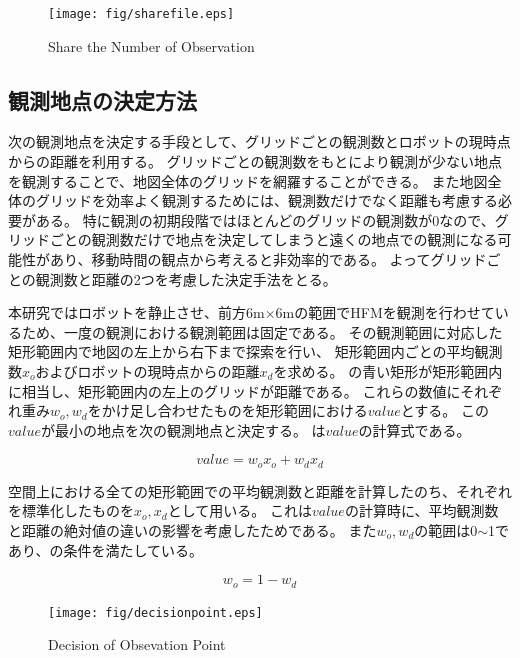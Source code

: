 \documentclass{jsarticle}
\begin{document}
\begin{figure}[tbh]
 \centering
  \texttt{[image: fig/sharefile.eps]}
  \vspace*{-4mm}
  \caption{Share the Number of Observation}
  \label{fig: sharefile}
\end{figure}


\subsection{観測地点の決定方法}
\label{decide}
次の観測地点を決定する手段として、グリッドごとの観測数とロボットの現時点からの距離を利用する。
グリッドごとの観測数をもとにより観測が少ない地点を観測することで、地図全体のグリッドを網羅することができる。
また地図全体のグリッドを効率よく観測するためには、観測数だけでなく距離も考慮する必要がある。
特に観測の初期段階ではほとんどのグリッドの観測数が0なので、グリッドごとの観測数だけで地点を決定してしまうと遠くの地点での観測になる可能性があり、移動時間の観点から考えると非効率的である。
よってグリッドごとの観測数と距離の2つを考慮した決定手法をとる。

本研究ではロボットを静止させ、前方6m$\times$6mの範囲でHFMを観測を行わせているため、一度の観測における観測範囲は固定である。
その観測範囲に対応した矩形範囲内で地図の左上から右下まで探索を行い、
矩形範囲内ごとの平均観測数$x_{o}$およびロボットの現時点からの距離$x_{d}$を求める。
の青い矩形が矩形範囲内に相当し、矩形範囲内の左上のグリッドが距離である。
これらの数値にそれぞれ重み$w_{o},w_{d}$をかけ足し合わせたものを矩形範囲における$value$とする。
この$value$が最小の地点を次の観測地点と決定する。
は$value$の計算式である。

\begin{equation}
  value = w_{o}x_{o} + w_{d}x_{d}
	\label{eqn: value}
\end{equation}

空間上における全ての矩形範囲での平均観測数と距離を計算したのち、それぞれを標準化したものを$x_o,x_d$として用いる。
これは$value$の計算時に、平均観測数と距離の絶対値の違いの影響を考慮したためである。
また$w_o,w_d$の範囲は0$\sim$1であり、の条件を満たしている。

\begin{equation}
  w_o = 1 - w_d
	\label{eqn: weight}
\end{equation}


\begin{figure}[tbh]
 \centering
  \texttt{[image: fig/decisionpoint.eps]}
  \vspace*{-4mm}
  \caption{Decision of Obsevation Point}
  \label{fig: value-method}
\end{figure}
\end{document}

